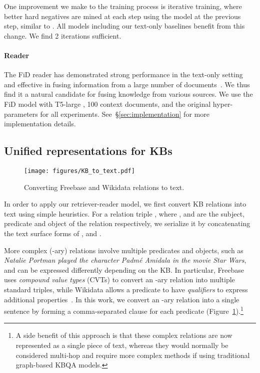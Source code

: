 \documentclass[11pt]{article}
\newcommand{\secref}[1]{\S\ref{#1}}
\begin{document}
One improvement we make to the training process is iterative training, where better hard negatives are mined at each step using the model at the previous step, similar to \citep{xiong2020approximate}.  All models including our text-only baselines benefit from this change.  We find 2 iterations sufficient.

\paragraph{Reader}
The FiD reader has demonstrated strong performance in the text-only setting and effective in fusing information from a large number of documents~\citep{izacard-grave-2021-leveraging}.  We thus find it a natural candidate for fusing knowledge from various sources.
We use the FiD model with T5-large \citep{t5}, 100 context documents, and the original hyper-parameters for all experiments.
See~\secref{sec:implementation} for more implementation details.

\subsection{Unified representations for KBs}\label{sec:model:kbqa}


\begin{figure}
    \centering
    \texttt{[image: figures/KB\_to\_text.pdf]}
    \caption{Converting Freebase and Wikidata relations to text.}
    \label{fig:kb_to_text_example}
    \vspace{-3mm}
\end{figure}

In order to apply our retriever-reader model, we first convert KB relations into text using simple heuristics.
For a relation triple , where ,  and  are the subject, predicate and object of the relation respectively, we serialize it by concatenating the text surface forms of ,  and .

More complex (-ary) relations involve multiple predicates and objects, such as \emph{Natalie Portman played the character Padm\'e Amidala in the movie Star Wars}, and can be expressed differently depending on the KB.
In particular, Freebase uses \emph{compound value types} (CVTs) to convert an -ary relation into multiple standard triples, while Wikidata allows a predicate to have \emph{qualifiers} to express additional properties~\cite{freebase2wikidata}.
In this work, we convert an -ary relation into a single sentence by forming a comma-separated clause for each predicate (Figure~\ref{fig:kb_to_text_example}).\footnote{A side benefit of this approach is that these complex relations are now represented as a single piece of text, whereas they would normally be considered multi-hop and require more complex methods \citep{fu2020survey} if using traditional graph-based KBQA models.}
\end{document}
